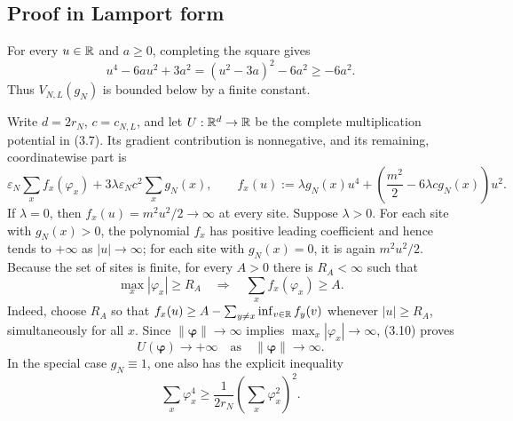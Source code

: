 \documentclass[11pt,a4paper]{article}
\newcommand{\eps}{\varepsilon}
\begin{document}
\subsection*{Proof in Lamport form}


For every \(u\in\mathbb R\) and \(a\ge0\), completing the square gives
\[
 u^4-6au^2+3a^2=(u^2-3a)^2-6a^2\ge-6a^2.                      \tag{3.8}
\]
Thus \(V_{N,L}(g_N)\) is bounded below by a finite constant.


Write \(d=2r_N\), \(c=c_{N,L}\), and let \(U:\mathbb R^d\to\mathbb R\) be the complete
multiplication potential in (3.7).  Its gradient contribution is nonnegative,
and its remaining, coordinatewise part is
\[
 \eps_N\sum_x f_x(\varphi_x)
 +3\lambda\eps_Nc^2\sum_xg_N(x),\qquad
 f_x(u):=\lambda g_N(x)u^4+
       \left(\frac{m^2}{2}-6\lambda c g_N(x)\right)u^2.        \tag{3.9}
\]
If \(\lambda=0\), then \(f_x(u)=m^2u^2/2\to\infty\) at every site.  Suppose
\(\lambda>0\).  For each site with \(g_N(x)>0\), the polynomial \(f_x\) has
positive leading coefficient and hence tends to \(+\infty\) as \(|u|\to
\infty\); for each site with \(g_N(x)=0\), it is again \(m^2u^2/2\).
Because the set of sites is finite, for every \(A>0\) there is \(R_A<\infty\)
such that
\[
 \max_x|\varphi_x|\ge R_A
 \quad\Longrightarrow\quad
 \sum_x f_x(\varphi_x)\ge A.                                  \tag{3.10}
\]
Indeed, choose \(R_A\) so that
\(f_x(u)\ge A-\sum_{y\ne x}\inf_{v\in\mathbb R}f_y(v)\) whenever
\(|u|\ge R_A\), simultaneously for all \(x\).  Since
\(\|\bm\varphi\|\to\infty\) implies
\(\max_x|\varphi_x|\to\infty\), (3.10) proves
\[
 U(\bm\varphi)\longrightarrow+\infty
 \quad\text{as}\quad\|\bm\varphi\|\longrightarrow\infty.   \tag{3.11}
\]
In the special case \(g_N\equiv1\), one also has the explicit inequality
\[
 \sum_x\varphi_x^4\ge\frac1{2r_N}\left(\sum_x\varphi_x^2\right)^2. \tag{3.12}
\]

\end{document}
